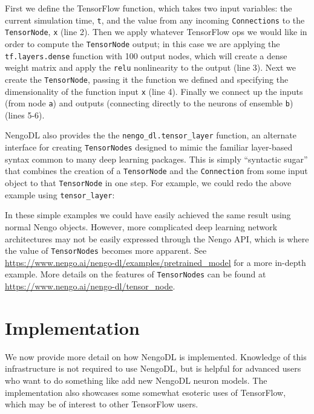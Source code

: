 \documentclass{article}
\begin{document}


First we define the TensorFlow function, which takes two input variables: the current simulation time, \texttt{t}, and the value from any incoming \texttt{Connections} to the \texttt{TensorNode}, \texttt{x} (line 2).  Then we apply whatever TensorFlow ops we would like in order to compute the \texttt{TensorNode} output; in this case we are applying the \texttt{tf.layers.dense} function with 100 output nodes, which will create a dense weight matrix and apply the \texttt{relu} nonlinearity to the output (line 3).  Next we create the \texttt{TensorNode}, passing it the function we defined and specifying the dimensionality of the function input \texttt{x} (line 4).  Finally we connect up the inputs (from node \texttt{a}) and outputs (connecting directly to the neurons of ensemble \texttt{b}) (lines 5-6).

NengoDL also provides the the \texttt{nengo\_dl.tensor\_layer} function, an alternate interface for creating \texttt{TensorNodes} designed to mimic the familiar layer-based syntax common to many deep learning packages.  This is simply ``syntactic sugar'' that combines the creation of a \texttt{TensorNode} and the \texttt{Connection} from some input object to that \texttt{TensorNode} in one step.  For example, we could redo the above example using \texttt{tensor\_layer}:



In these simple examples we could have easily achieved the same result using normal Nengo objects.  However, more complicated deep learning network architectures may not be easily expressed through the Nengo API, which is where the value of \texttt{TensorNodes} becomes more apparent.  See \url{https://www.nengo.ai/nengo-dl/examples/pretrained_model} for a more in-depth example.  More details on the features of \texttt{TensorNodes} can be found at \url{https://www.nengo.ai/nengo-dl/tensor_node}.

\section{Implementation}
\label{sec:implementation}

We now provide more detail on how NengoDL is implemented.  Knowledge of this infrastructure is not required to use NengoDL, but is helpful for advanced users who want to do something like add new NengoDL neuron models.  The implementation also showcases some somewhat esoteric uses of TensorFlow, which may be of interest to other TensorFlow users.
\end{document}
